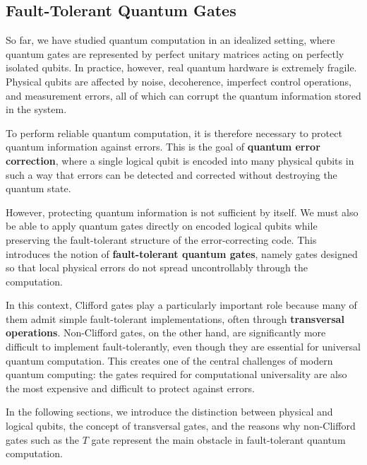 \subsection{Fault-Tolerant Quantum Gates}

So far, we have studied quantum computation in an idealized setting, where quantum gates are represented by perfect unitary matrices acting on perfectly isolated qubits. In practice, however, real quantum hardware is extremely fragile. Physical qubits are affected by noise, decoherence, imperfect control operations, and measurement errors, all of which can corrupt the quantum information stored in the system.

\highspace
To perform reliable quantum computation, it is therefore necessary to protect quantum information against errors. This is the goal of \textbf{quantum error correction}, where a single logical qubit is encoded into many physical qubits in such a way that errors can be detected and corrected without destroying the quantum state.

\highspace
However, protecting quantum information is not sufficient by itself. We must also be able to apply quantum gates directly on encoded logical qubits while preserving the fault-tolerant structure of the error-correcting code. This introduces the notion of \textbf{fault-tolerant quantum gates}, namely gates designed so that local physical errors do not spread uncontrollably through the computation.

\highspace
In this context, Clifford gates play a particularly important role because many of them admit simple fault-tolerant implementations, often through \textbf{transversal operations}. Non-Clifford gates, on the other hand, are significantly more difficult to implement fault-tolerantly, even though they are essential for universal quantum computation. This creates one of the central challenges of modern quantum computing: the gates required for computational universality are also the most expensive and difficult to protect against errors.

\highspace
In the following sections, we introduce the distinction between physical and logical qubits, the concept of transversal gates, and the reasons why non-Clifford gates such as the $T$ gate represent the main obstacle in fault-tolerant quantum computation.